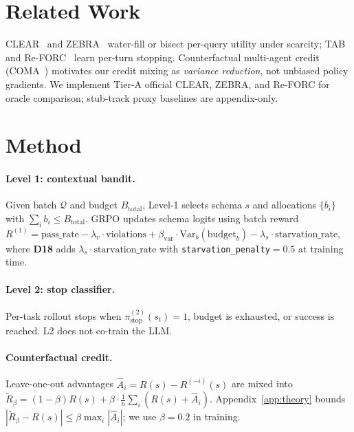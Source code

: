 \documentclass[11pt,letterpaper]{article}
\begin{document}
\section{Related Work}
\label{sec:related}

CLEAR~\citep{wan2026clear} and ZEBRA~\citep{hamri2026zebra} water-fill or bisect per-query utility under scarcity; TAB~\citep{jali2026tab} and Re-FORC~\citep{zabounidis2025reforc} learn per-turn stopping.
Counterfactual multi-agent credit (COMA~\citep{foerster2018coma}) motivates our credit mixing as \emph{variance reduction}, not unbiased policy gradients.
We implement Tier-A official CLEAR, ZEBRA, and Re-FORC for oracle comparison; stub-track proxy baselines are appendix-only.

\section{Method}
\label{sec:method}

\paragraph{Level 1: contextual bandit.}
Given batch $\mathcal{Q}$ and budget $B_{\mathrm{total}}$, Level-1 selects schema $s$ and allocations $\{b_i\}$ with $\sum_i b_i \le B_{\mathrm{total}}$.
GRPO updates schema logits using batch reward
$R^{(1)} = \mathrm{pass\_rate} - \lambda_v \cdot \mathrm{violations} + \beta_{\mathrm{var}} \cdot \mathrm{Var}_b(\mathrm{budget}_b) - \lambda_s \cdot \mathrm{starvation\_rate}$,
where \textbf{D18} adds $\lambda_s \cdot \mathrm{starvation\_rate}$ with \texttt{starvation\_penalty}${=}0.5$ at training time.

\paragraph{Level 2: stop classifier.}
Per-task rollout stops when $\pi^{(2)}_{\mathrm{stop}}(s_t){=}1$, budget is exhausted, or success is reached.
L2 does not co-train the LLM.

\paragraph{Counterfactual credit.}
Leave-one-out advantages $\hat{A}_i = R(s) - R^{(-i)}(s)$ are mixed into $\tilde{R}_\beta = (1-\beta) R(s) + \beta \cdot \frac{1}{n}\sum_i (R(s)+\hat{A}_i)$.
Appendix~\ref{app:theory} bounds $|\tilde{R}_\beta - R(s)| \le \beta \max_i |\hat{A}_i|$; we use $\beta{=}0.2$ in training.
\end{document}
